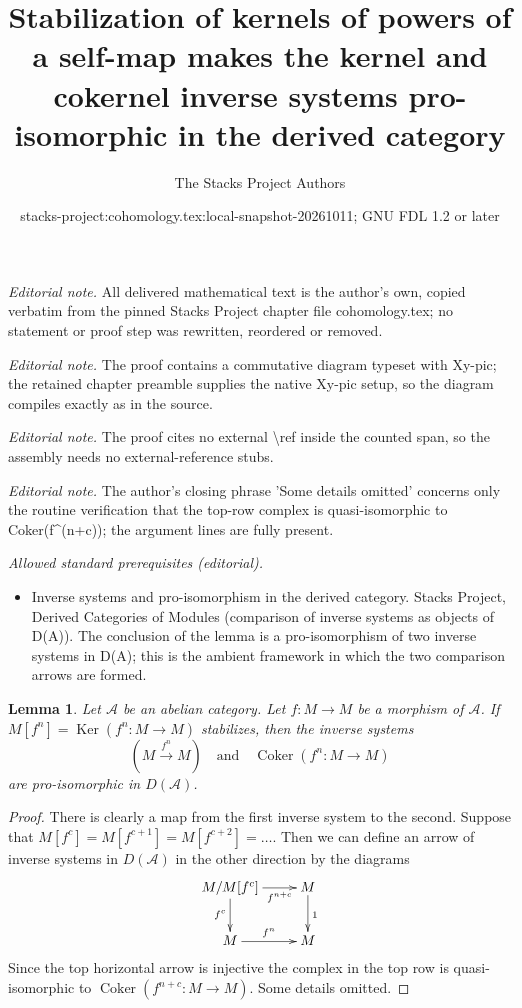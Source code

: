 \documentclass[10pt,a4paper]{amsart}
\title{Stabilization of kernels of powers of a self-map makes the kernel and cokernel inverse systems pro-isomorphic in the derived category}
\author{The Stacks Project Authors}
\date{stacks-project:cohomology.tex:local-snapshot-20261011; GNU FDL 1.2 or later}
\theoremstyle{plain}
\newtheorem{lemma}[subsection]{Lemma}
\theoremstyle{definition}
\theoremstyle{remark}
\numberwithin{equation}{subsection}
\def\Ker{\mathop{\mathrm{Ker}}}
\def\Coker{\mathop{\mathrm{Coker}}}
\begin{document}
\maketitle
\noindent\textit{Editorial note.} All delivered mathematical text is the author's own, copied verbatim from the pinned Stacks Project chapter file cohomology.tex; no statement or proof step was rewritten, reordered or removed.\par\medskip
\noindent\textit{Editorial note.} The proof contains a commutative diagram typeset with Xy-pic; the retained chapter preamble supplies the native Xy-pic setup, so the diagram compiles exactly as in the source.\par\medskip
\noindent\textit{Editorial note.} The proof cites no external \textbackslash{}ref inside the counted span, so the assembly needs no external-reference stubs.\par\medskip
\noindent\textit{Editorial note.} The author's closing phrase 'Some details omitted' concerns only the routine verification that the top-row complex is quasi-isomorphic to Coker(f\textasciicircum{}(n+c)); the argument lines are fully present.\par\medskip
\noindent\textit{Allowed standard prerequisites (editorial).}\begin{itemize}
\item Inverse systems and pro-isomorphism in the derived category. Stacks Project, Derived Categories of Modules (comparison of inverse systems as objects of D(A)). The conclusion of the lemma is a pro-isomorphism of two inverse systems in D(A); this is the ambient framework in which the two comparison arrows are formed.
\end{itemize}\medskip
\begin{lemma}
\label{lemma-stabilizes}
Let $\mathcal{A}$ be an abelian category. Let $f : M \to M$ be a morphism
of $\mathcal{A}$. If $M[f^n] = \Ker(f^n : M \to M)$ stabilizes, then the
inverse systems
$$
(M \xrightarrow{f^n} M)
\quad\text{and}\quad
\Coker(f^n : M \to M)
$$
are pro-isomorphic in $D(\mathcal{A})$.
\end{lemma}

\begin{proof}
There is clearly a map from the first inverse system to the second. Suppose that
$M[f^c] = M[f^{c + 1}] = M[f^{c + 2}] = \ldots$.
Then we can define an arrow of inverse systems in $D(\mathcal{A})$
in the other direction by the diagrams
$$
\xymatrix{
M/M[f^c] \ar[r]_-{f^{n + c}} \ar[d]_{f^c} &
M \ar[d]^1 \\
M \ar[r]^{f^n} & M
}
$$
Since the top horizontal arrow is injective the complex
in the top row is quasi-isomorphic to $\Coker(f^{n + c} : M \to M)$.
Some details omitted.
\end{proof}
\end{document}
